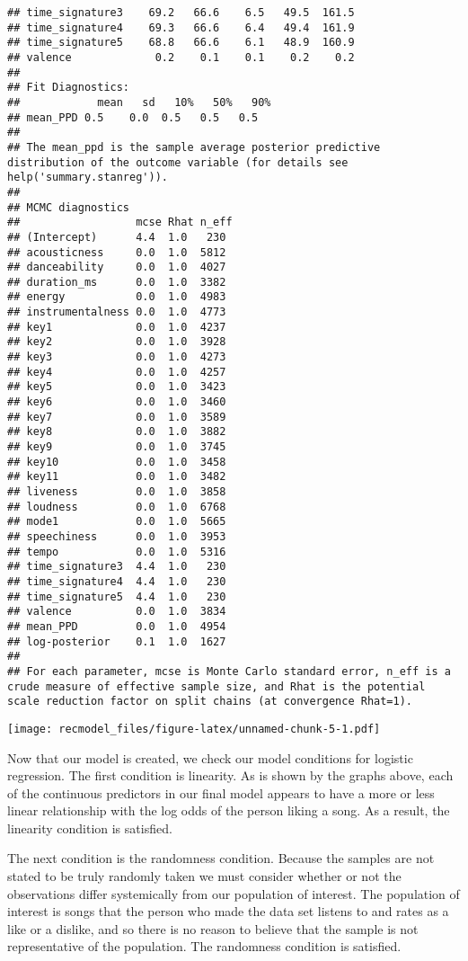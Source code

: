 \documentclass[
]{article}
\begin{document}
\begin{verbatim}
## time_signature3    69.2   66.6    6.5   49.5  161.5
## time_signature4    69.3   66.6    6.4   49.4  161.9
## time_signature5    68.8   66.6    6.1   48.9  160.9
## valence             0.2    0.1    0.1    0.2    0.2
## 
## Fit Diagnostics:
##            mean   sd   10%   50%   90%
## mean_PPD 0.5    0.0  0.5   0.5   0.5  
## 
## The mean_ppd is the sample average posterior predictive distribution of the outcome variable (for details see help('summary.stanreg')).
## 
## MCMC diagnostics
##                  mcse Rhat n_eff
## (Intercept)      4.4  1.0   230 
## acousticness     0.0  1.0  5812 
## danceability     0.0  1.0  4027 
## duration_ms      0.0  1.0  3382 
## energy           0.0  1.0  4983 
## instrumentalness 0.0  1.0  4773 
## key1             0.0  1.0  4237 
## key2             0.0  1.0  3928 
## key3             0.0  1.0  4273 
## key4             0.0  1.0  4257 
## key5             0.0  1.0  3423 
## key6             0.0  1.0  3460 
## key7             0.0  1.0  3589 
## key8             0.0  1.0  3882 
## key9             0.0  1.0  3745 
## key10            0.0  1.0  3458 
## key11            0.0  1.0  3482 
## liveness         0.0  1.0  3858 
## loudness         0.0  1.0  6768 
## mode1            0.0  1.0  5665 
## speechiness      0.0  1.0  3953 
## tempo            0.0  1.0  5316 
## time_signature3  4.4  1.0   230 
## time_signature4  4.4  1.0   230 
## time_signature5  4.4  1.0   230 
## valence          0.0  1.0  3834 
## mean_PPD         0.0  1.0  4954 
## log-posterior    0.1  1.0  1627 
## 
## For each parameter, mcse is Monte Carlo standard error, n_eff is a crude measure of effective sample size, and Rhat is the potential scale reduction factor on split chains (at convergence Rhat=1).
\end{verbatim}

\texttt{[image: recmodel\_files/figure-latex/unnamed-chunk-5-1.pdf]}

Now that our model is created, we check our model conditions for
logistic regression. The first condition is linearity. As is shown by
the graphs above, each of the continuous predictors in our final model
appears to have a more or less linear relationship with the log odds of
the person liking a song. As a result, the linearity condition is
satisfied.

The next condition is the randomness condition. Because the samples are
not stated to be truly randomly taken we must consider whether or not
the observations differ systemically from our population of interest.
The population of interest is songs that the person who made the data
set listens to and rates as a like or a dislike, and so there is no
reason to believe that the sample is not representative of the
population. The randomness condition is satisfied.
\end{document}
